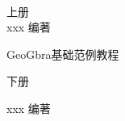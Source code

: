 \documentclass{ctexart}
\begin{document}
{\\[5mm]上册\\[1.5mm]xxx\,\,编著\\} \vspace{8mm}
\centerline {\kaishu {}GeoGbra基础范例教程} \vspace{5mm}
\centerline {下册} \vspace{1.5mm}
\centerline {xxx\,\,编著}
 
\end{document}
